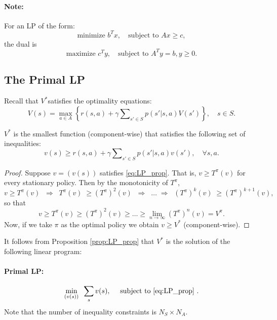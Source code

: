 \paragraph{Note:} For an LP of the form:
\begin{equation*}
 \textrm{minimize } {b^T}x,   \quad \textrm{subject to } Ax \ge c,
\end{equation*}
the dual is
\begin{equation*}
\textrm{maximize } {c^T}y,   \quad \textrm{subject to } {A^T}y = b,  y \ge 0.
\end{equation*}

\subsection{The Primal LP}
Recall that ${V^*}$satisfies the optimality equations:
\[V(s) = \mathop {\max }\limits_{a \in A} \left\{ {r(s,a) + \gamma \sum\nolimits_{s' \in S} {p(s'|s,a)V(s')} } \right\},     \quad s \in S.\]
\begin{proposition}\label{prop:LP_prop}
${V^*}$ is the smallest function (component-wise) that satisfies the following set of
inequalities:
\begin{equation}\label{eq:LP_prop}
v(s) \ge r(s,a) + \gamma \sum\nolimits_{s' \in S} {p(s'|s,a)v(s')} ,\quad \forall s,a.
\end{equation}
\end{proposition}
\begin{proof}
Suppose $v = (v(s))$ satisfies \eqref{eq:LP_prop}. That is, $v \ge T_{}^\pi (v)$ for every stationary policy. Then by the monotonicity of $T_{}^\pi $,
\[v \ge T_{}^\pi (v)\;\; \Rightarrow \;\;T_{}^\pi (v)\; \ge {(T_{}^\pi )^2}(v)\;\; \Rightarrow \;\; \ldots \; \Rightarrow \;\;{(T_{}^\pi )^k}(v)\; \ge {(T_{}^\pi )^{k + 1}}(v),\]
so that
\[v \ge T_{}^\pi (v) \ge {(T_{}^\pi )^2}(v) \ge  \ldots  \ge \mathop {\lim }\limits_{n \to \infty } {(T_{}^\pi )^n}(v) = {V^\pi }.\]
Now, if we take $\pi$  as the optimal policy we obtain $v \ge {V^*}$ (component-wise).
\end{proof}
It follows from Proposition \ref{prop:LP_prop} that ${V^*}$ is the solution of the following linear program:
\paragraph{Primal LP:	}
\[\mathop {\min }\limits_{(v(s))} \;\;\sum\limits_s {v(s)}, \quad \textrm{ subject to \eqref{eq:LP_prop} } .\]
Note that the number of inequality constraints is ${N_S}\times{N_A}$.

